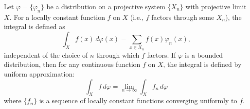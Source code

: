 Let $\varphi = \{\varphi_n\}$ be a distribution on a projective system $\{X_n\}$ with projective limit $X$. For a locally constant function $f$ on $X$ (i.e., $f$ factors through some $X_n$), the integral is defined as
$$\int_X f(x) \, d\varphi(x) = \sum_{x \in X_n} f(x) \varphi_n(x),$$
independent of the choice of $n$ through which $f$ factors. If $\varphi$ is a bounded distribution, then for any continuous function $f$ on $X$, the integral is defined by uniform approximation:
$$\int_X f \, d\varphi = \lim_{n \to \infty} \int_X f_n \, d\varphi$$
where $\{f_n\}$ is a sequence of locally constant functions converging uniformly to $f$.
